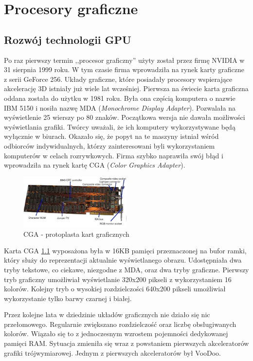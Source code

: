 \chapter{Procesory graficzne}
	\section{Rozwój technologii GPU}
Po raz pierwszy termin ,,procesor graficzny'' użyty został przez firmę NVIDIA w 31 sierpnia 1999 roku. W tym czasie firma wprowadziła na rynek karty graficzne z serii GeForce 256. Układy graficzne, które posiadały procesory wspierające akcelerację 3D istniały już wiele lat wcześniej. Pierwsza na świecie karta graficzna oddana została do użytku w 1981 roku\cite{web-info-komputery}. Była ona częścią komputera o nazwie IBM 5150 i nosiła nazwę MDA (\emph{Monochrome Display Adapter}). Pozwalała na wyświetlenie 25 wierszy po 80 znaków. Początkowa wersja nie dawała możliwości wyświetlania grafiki. Twórcy uważali, że ich komputery wykorzystywane będą wyłącznie w biurach. Okazało się, że popyt na te maszyny istniał wśród odbiorców indywidualnych, którzy zainteresowani byli wykorzystaniem komputerów w celach rozrywkowych. Firma szybko naprawiła swój błąd i wprowadziła na rynek kartę CGA (\emph{Color Graphics Adapter}).

\begin{figure}
\centering
\includegraphics[width=0.5\textwidth]{img/cga.jpg}
\caption{CGA - protoplasta kart graficznych}
\label{fig-cga}
\end{figure}

Karta CGA \ref{fig-cga} wyposażona była w 16KB pamięci przeznaczonej na bufor ramki, który służy do reprezentacji aktualnie wyświetlanego obrazu. Udostępniała dwa tryby tekstowe, co ciekawe, niezgodne z MDA, oraz dwa tryby graficzne. Pierwszy tryb graficzny umożliwiał wyświetlanie 320x200 pikseli z wykorzystaniem 16 kolorów.
Kolejny tryb o wysokiej rozdzielczości 640x200 pikseli umożliwiał wykorzystanie tylko barwy czarnej i białej.

Przez kolejne lata w dziedzinie układów graficznych nie działo się nic przełomowego. Regularnie zwiększano rozdzielczość oraz liczbę obsługiwanych kolorów. Wiązało się to z jednoczesnym wzrostem pojemności dedykowanej pamięci RAM. Sytuacja zmieniła się wraz z powstaniem pierwszych akceleratorów grafiki trójwymiarowej. Jednym z pierwszych akceleratorów był VooDoo. 
	
